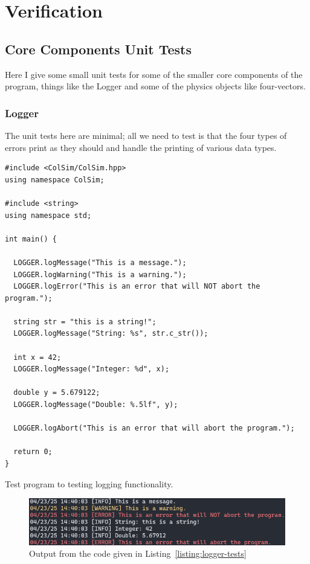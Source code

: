 \section{Verification}

\subsection{Core Components Unit Tests}

Here I give some small unit tests for some of the smaller core components of the program, things like the Logger and some of the physics objects like four-vectors.

\subsubsection{Logger}

The unit tests here are minimal; all we need to test is that the four types of errors print as they should and handle the printing of various data types.

\begin{listing}
  \begin{verbatim}
#include <ColSim/ColSim.hpp>
using namespace ColSim;

#include <string>
using namespace std;

int main() {

  LOGGER.logMessage("This is a message.");
  LOGGER.logWarning("This is a warning.");
  LOGGER.logError("This is an error that will NOT abort the program.");

  string str = "this is a string!";
  LOGGER.logMessage("String: %s", str.c_str());

  int x = 42;
  LOGGER.logMessage("Integer: %d", x);

  double y = 5.679122;
  LOGGER.logMessage("Double: %.5lf", y);

  LOGGER.logAbort("This is an error that will abort the program.");

  return 0;
}
  \end{verbatim}
  \caption{Test program to testing logging functionality.}
  \label{listing:logger-tests}
\end{listing}

\begin{figure}[ht]
  \centering
  \includegraphics[width=0.7\linewidth]{./res/gfx/logger-tests.png}
  \caption{Output from the code given in Listing~\ref{listing:logger-tests}}
  \label{fig:logger-tests}
\end{figure}

